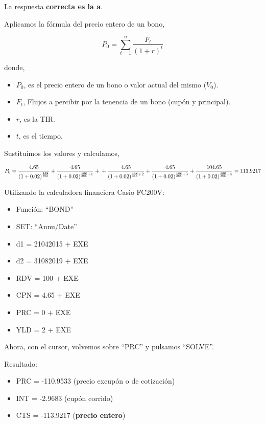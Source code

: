 \documentclass[
  letterpaper,
  DIV=11,
  numbers=noendperiod]{scrreprt}
\begin{document}
\begin{tcolorbox}[enhanced jigsaw, left=2mm, opacityback=0, colback=white, breakable, arc=.35mm, bottomrule=.15mm, rightrule=.15mm, toprule=.15mm, leftrule=.75mm, colframe=quarto-callout-tip-color-frame]
\begin{minipage}[t]{5.5mm}
\textcolor{quarto-callout-tip-color}{\faLightbulb}
\end{minipage}%
\begin{minipage}[t]{\textwidth - 5.5mm}

La respuesta \textbf{correcta es la a}.

Aplicamos la fórmula del precio entero de un bono,

\[P_0=\sum_{ t=1}^{ n}\frac{F_t}{(1+r)^{t}}\]

donde,

\begin{itemize}
\item
  \(P_0\), es el precio entero de un bono o valor actual del mismo
  (\(V_0\)).
\item
  \(F_t\), Flujos a percibir por la tenencia de un bono (cupón y
  principal).
\item
  \(r\), es la TIR.
\item
  \(t\), es el tiempo.
\end{itemize}

Sustituimos los valores y calculamos,

\[P_0=\frac{4.65}{\left(1+0.02\right)^{\frac{132}{365}}}+\frac{4.65}{\left(1+0.02\right)^{\frac{132}{365}+1}}+\\+\frac{4.65}{\left(1+0.02\right)^{\frac{132}{365}+2}}+\frac{4.65}{\left(1+0.02\right)^{\frac{132}{365}+3}}+\frac{104.65}{\left(1+0.02\right)^{\frac{132}{365}+4}}=113.9217\]

Utilizando la calculadora financiera Casio FC200V:

\begin{itemize}
\item
  Función: ``BOND''
\item
  SET: ``Annu/Date''
\item
  d1 = 21042015 + EXE
\item
  d2 = 31082019 + EXE
\item
  RDV = 100 + EXE
\item
  CPN = 4.65 + EXE
\item
  PRC = 0 + EXE
\item
  YLD = 2 + EXE
\end{itemize}

Ahora, con el cursor, volvemos sobre ``PRC'' y pulsamos ``SOLVE''.

Resultado:

\begin{itemize}
\item
  PRC = -110.9533 (precio excupón o de cotización)
\item
  INT = -2.9683 (cupón corrido)
\item
  CTS = -113.9217 (\textbf{precio entero})
\end{itemize}

\end{minipage}%
\end{tcolorbox}
\end{document}
